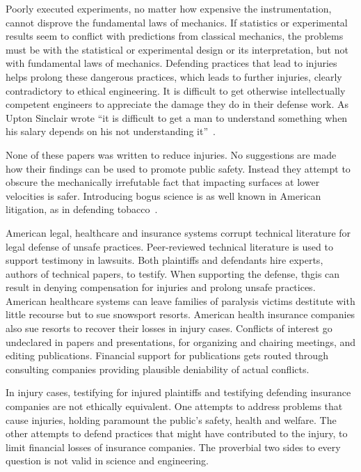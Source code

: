 \documentclass[smallextended]{svjour3}       %
\begin{document}
Poorly executed experiments, no matter how expensive the
instrumentation, cannot disprove the fundamental laws of mechanics. If statistics
or experimental results seem to conflict with predictions from classical
mechanics, the problems must be with the statistical or experimental design or its
interpretation, but not with fundamental laws of mechanics. Defending practices
that lead to injuries helps prolong these dangerous practices, which leads to
further injuries, clearly contradictory to ethical engineering. It is difficult
to get otherwise intellectually competent engineers to appreciate the damage
they do in their defense work. As Upton Sinclair wrote ``it is difficult
to get a man to understand something when his salary depends on his not
understanding it''~\cite{Sinclair1994}.

None of these papers was written to reduce injuries. No suggestions
are made how their findings can be used to promote public safety. Instead they
attempt to obscure the mechanically irrefutable fact that impacting surfaces at
lower velocities is safer. Introducing bogus science is as well known in American
litigation, as in defending tobacco~\cite{Oreskes2010}.

American legal, healthcare and insurance systems corrupt technical literature
for legal defense of unsafe practices. Peer-reviewed technical literature is
used to support testimony in lawsuits. Both plaintiffs and defendants hire
experts, authors of technical papers, to testify.  When supporting the
defense, thgis can result in denying compensation for injuries and prolong unsafe
practices. American healthcare systems can leave families of paralysis victims
 destitute with little recourse but to sue snowsport resorts. American
health insurance companies also sue resorts to recover their losses in injury
cases. Conflicts of interest go undeclared in papers and presentations, for
organizing and chairing meetings, and editing publications. Financial support for
publications gets routed through consulting companies providing plausible
deniability of actual conflicts.

In injury cases, testifying for injured plaintiffs and testifying defending
insurance companies are not ethically equivalent. One attempts to address
problems that cause injuries, holding paramount the public's safety, health and 
welfare. The other attempts to defend practices that might have
contributed to the injury, to limit financial losses of insurance
companies. The proverbial two sides to every question is not valid in science
and engineering.
\end{document}
